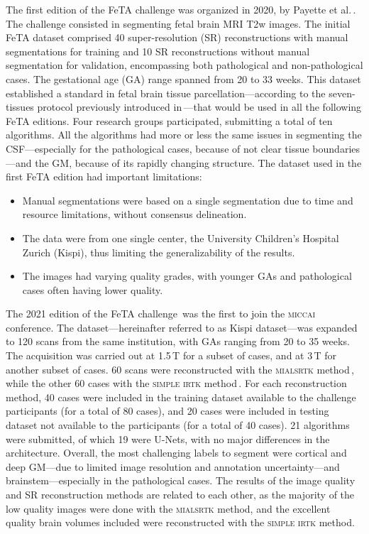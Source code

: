 The first edition of the FeTA challenge was organized in 2020, by Payette et al.\,\cite{FeTA2020_review}. The challenge consisted in segmenting fetal brain MRI T2w images. The initial FeTA dataset comprised 40 super-resolution (SR) reconstructions with manual segmentations for training and 10 SR reconstructions without manual segmentation for validation, encompassing both pathological and non-pathological cases. The gestational age (GA) range spanned from 20 to 33 weeks. This dataset established a standard in fetal brain tissue parcellation---according to the seven-tissues protocol previously introduced in\,\cite{Payette2020}---that would be used in all the following FeTA editions. Four research groups participated, submitting a total of ten algorithms. All the algorithms had more or less the same issues in segmenting the CSF---especially for the pathological cases, because of not clear tissue boundaries---and the GM, because of its rapidly changing structure.
The dataset used in the first FeTA edition had important limitations:
\begin{itemize}
    \item Manual segmentations were based on a single segmentation due to time and resource limitations, without consensus delineation.
    \item The data were from one single center, the University Children's Hospital Zurich (Kispi), thus limiting the generalizability of the results.
    \item The images had varying quality grades, with younger GAs and pathological cases often having lower quality.
\end{itemize}

The 2021 edition of the FeTA challenge\,\cite{FeTA2021_review, FeTA2021} was the first to join the \textsc{miccai} conference. The dataset---hereinafter referred to as Kispi dataset---was expanded to 120 scans from the same institution, with GAs ranging from 20 to 35 weeks. The acquisition was carried out at 1.5\,T for a subset of cases, and at 3\,T for another subset of cases. 60 scans were reconstructed with the \textsc{mialsrtk} method\,\cite{Tourbier2015, MIALSRTK}, while the other 60 cases with the \textsc{simple irtk} method\,\cite{Kuklisova2012, irtk-simple}. For each reconstruction method, 40 cases were included in the training dataset available to the challenge participants (for a total of 80 cases), and 20 cases were included in testing dataset not available to the participants (for a total of 40 cases). 21 algorithms were submitted, of which 19 were U-Nets, with no major differences in the architecture. Overall, the most challenging labels to segment were cortical and deep GM---due to limited image resolution and annotation uncertainty---and brainstem---especially in the pathological cases. The results of the image quality and SR reconstruction methods are related to each other, as the majority of the low quality images were done with the \textsc{mialsrtk} method, and the excellent quality brain volumes included were reconstructed with the \textsc{simple irtk} method.

